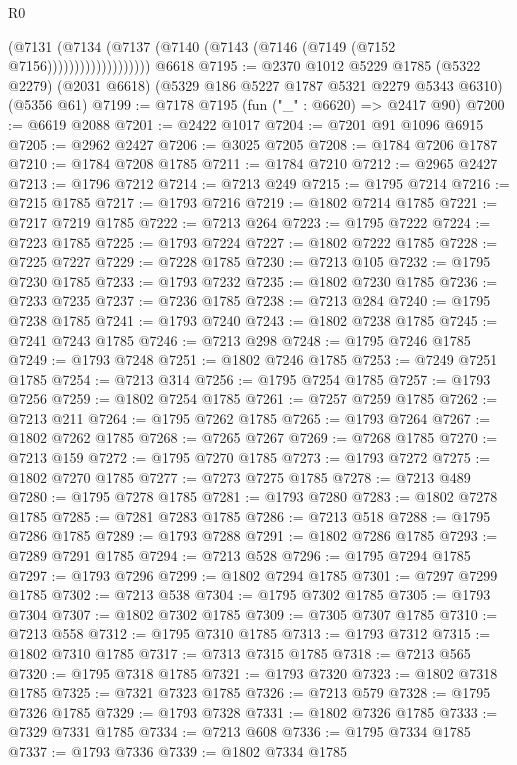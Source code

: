 \begin{lexlean}{R0}
\begin{coremodule}
                          (@7131
                            (@7134
                              (@7137 (@7140 (@7143 (@7146 (@7149 (@7152 @7156)))))))))))))))))))
    @6618
@7195 := @2370
    @1012
    @5229
    @1785
    (@5322 @2279)
    (@2031 @6618)
    (@5329 @186 @5227 @1787 @5321 @2279 @5343 @6310)
    (@5356 @61)
@7199 := @7178 @7195 (fun ("_" : @6620) => @2417 @90)
@7200 := @6619 @2088
@7201 := @2422 @1017
@7204 := @7201 @91 @1096 @6915
@7205 := @2962 @2427
@7206 := @3025 @7205
@7208 := @1784 @7206 @1787
@7210 := @1784 @7208 @1785
@7211 := @1784 @7210
@7212 := @2965 @2427
@7213 := @1796 @7212
@7214 := @7213 @249
@7215 := @1795 @7214
@7216 := @7215 @1785
@7217 := @1793 @7216
@7219 := @1802 @7214 @1785
@7221 := @7217 @7219 @1785
@7222 := @7213 @264
@7223 := @1795 @7222
@7224 := @7223 @1785
@7225 := @1793 @7224
@7227 := @1802 @7222 @1785
@7228 := @7225 @7227
@7229 := @7228 @1785
@7230 := @7213 @105
@7232 := @1795 @7230 @1785
@7233 := @1793 @7232
@7235 := @1802 @7230 @1785
@7236 := @7233 @7235
@7237 := @7236 @1785
@7238 := @7213 @284
@7240 := @1795 @7238 @1785
@7241 := @1793 @7240
@7243 := @1802 @7238 @1785
@7245 := @7241 @7243 @1785
@7246 := @7213 @298
@7248 := @1795 @7246 @1785
@7249 := @1793 @7248
@7251 := @1802 @7246 @1785
@7253 := @7249 @7251 @1785
@7254 := @7213 @314
@7256 := @1795 @7254 @1785
@7257 := @1793 @7256
@7259 := @1802 @7254 @1785
@7261 := @7257 @7259 @1785
@7262 := @7213 @211
@7264 := @1795 @7262 @1785
@7265 := @1793 @7264
@7267 := @1802 @7262 @1785
@7268 := @7265 @7267
@7269 := @7268 @1785
@7270 := @7213 @159
@7272 := @1795 @7270 @1785
@7273 := @1793 @7272
@7275 := @1802 @7270 @1785
@7277 := @7273 @7275 @1785
@7278 := @7213 @489
@7280 := @1795 @7278 @1785
@7281 := @1793 @7280
@7283 := @1802 @7278 @1785
@7285 := @7281 @7283 @1785
@7286 := @7213 @518
@7288 := @1795 @7286 @1785
@7289 := @1793 @7288
@7291 := @1802 @7286 @1785
@7293 := @7289 @7291 @1785
@7294 := @7213 @528
@7296 := @1795 @7294 @1785
@7297 := @1793 @7296
@7299 := @1802 @7294 @1785
@7301 := @7297 @7299 @1785
@7302 := @7213 @538
@7304 := @1795 @7302 @1785
@7305 := @1793 @7304
@7307 := @1802 @7302 @1785
@7309 := @7305 @7307 @1785
@7310 := @7213 @558
@7312 := @1795 @7310 @1785
@7313 := @1793 @7312
@7315 := @1802 @7310 @1785
@7317 := @7313 @7315 @1785
@7318 := @7213 @565
@7320 := @1795 @7318 @1785
@7321 := @1793 @7320
@7323 := @1802 @7318 @1785
@7325 := @7321 @7323 @1785
@7326 := @7213 @579
@7328 := @1795 @7326 @1785
@7329 := @1793 @7328
@7331 := @1802 @7326 @1785
@7333 := @7329 @7331 @1785
@7334 := @7213 @608
@7336 := @1795 @7334 @1785
@7337 := @1793 @7336
@7339 := @1802 @7334 @1785

\end{coremodule}
\end{lexlean}
